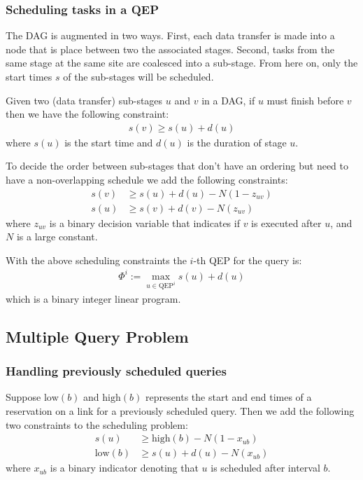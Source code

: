 \subsubsection{Scheduling tasks in a QEP}

The DAG is augmented in two ways.
First, each data transfer is made into a node that is place between two the associated stages.
Second, tasks from the same stage at the same site are coalesced into a sub-stage.
From here on, only the start times $s$ of the sub-stages will be scheduled.

Given two (data transfer) sub-stages $u$ and $v$ in a DAG, if $u$ must finish before $v$ then we have the following constraint:
\begin{align}
	s(v) \geq s(u) + d(u)
\end{align}
where $s(u)$ is the start time and $d(u)$ is the duration of stage $u$.

To decide the order between sub-stages that don't have an ordering but need to have a non-overlapping schedule we add the following constraints:
\begin{subequations}
	\begin{align}
		s(v) & \geq s(u) + d(u) - N(1-z_{uv}) \\
		s(u) & \geq s(v) + d(v) - N(z_{uv})
	\end{align}
\end{subequations}
where $z_{uv}$ is a binary decision variable that indicates if $v$ is executed after $u$, and $N$ is a large constant.

With the above scheduling constraints the $i$-th QEP for the query is:
\begin{align}
	\Phi^i := \max_{u\in\text{QEP}^i} s(u) + d(u)
\end{align}
which is a binary integer linear program.

\subsection{Multiple Query Problem}

\subsubsection{Handling previously scheduled queries}

Suppose $\text{low}(b)$ and $\text{high}(b)$ represents the start and end times of a reservation on a link for a previously scheduled query.
Then we add the following two constraints to the scheduling problem:
\begin{subequations}
	\begin{align}
		s(u) & \geq \text{high}(b) - N(1-x_{ub}) \\
		\text{low}(b) & \geq s(u) + d(u) - N(x_{ub})
	\end{align}
\end{subequations}
where $x_{ub}$ is a binary indicator denoting that $u$ is scheduled after interval $b$.

